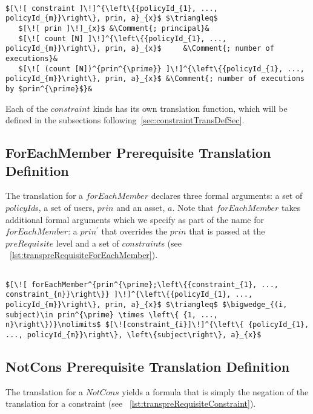 \lstset{mathescape, language=AST}  
\begin{lstlisting}[frame=single, caption={Prerequisite Translation Definition {$\colon$} Constraint},label={lst:transpreRequisiteConstraint}]

$[\![ constraint ]\!]^{\left\{{policyId_{1}, ..., policyId_{m}}\right\}, prin, a}_{x}$ $\triangleq$ 
   $[\![ prin ]\!]_{x}$ &\Comment{; principal}&
   $[\![ count [N] ]\!]^{\left\{{policyId_{1}, ..., policyId_{m}}\right\}, prin, a}_{x}$	 &\Comment{; number of executions}&
   $[\![ (count [N])^{prin^{\prime}} ]\!]^{\left\{{policyId_{1}, ..., policyId_{m}}\right\}, prin, a}_{x}$ &\Comment{; number of executions by $prin^{\prime}$}&
\end{lstlisting}

Each of the $constraint$ kinds has its own translation function, which will be defined in the subsections following~\ref{sec:constraintTransDefSec}.

\subsection{ForEachMember Prerequisite Translation Definition}
The translation for a $forEachMember$ declares three formal arguments: a set of $policyId$s, a set of users, $prin$ and an asset, $a$. Note that $forEachMember$ takes additional formal arguments which we specify as part of the name for $forEachMember$: a $prin^{\prime}$ that overrides the $prin$ that is passed at the $preRequisite$ level and a set of $constraint$s (see ~\ref{lst:transpreRequisiteForEachMember}).


\lstset{mathescape, language=AST}  
\begin{lstlisting}[frame=single, caption={Prerequisite Translation Definition {$\colon$} ForEachMember},label={lst:transpreRequisiteForEachMember}]

$[\![ forEachMember^{prin^{\prime};\left\{{constraint_{1}, ..., constraint_{n}}\right\}} ]\!]^{\left\{{policyId_{1}, ..., policyId_{m}}\right\}, prin, a}_{x}$ $\triangleq$ $\bigwedge_{(i, subject)\in prin^{\prime} \times \left\{ {1, ..., n}\right\})}\nolimits$ $[\![constraint_{i}]\!]^{\left\{ {policyId_{1}, ..., policyId_{m}}\right\}, \left\{subject\right\}, a}_{x}$
\end{lstlisting}



\subsection{NotCons Prerequisite Translation Definition}
The translation for a $NotCons$ yields a formula that is simply the negation of the translation for a constraint (see ~\ref{lst:transpreRequisiteConstraint}).

